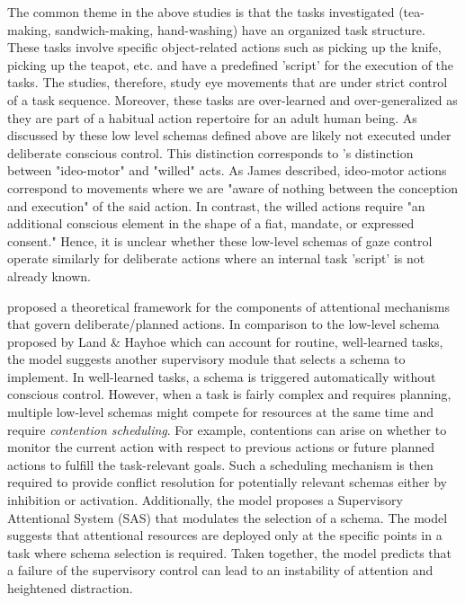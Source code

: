 The common theme in the above studies is that the tasks investigated (tea-making, sandwich-making, hand-washing) have an organized task structure. These tasks involve specific object-related actions such as picking up the knife, picking up the teapot, etc. and have a predefined 'script' for the execution of the tasks. The studies, therefore, study eye movements that are under strict control of a task sequence. Moreover, these tasks are over-learned and over-generalized as they are part of a habitual action repertoire for an adult human being. As discussed by \citet{Land2006-da} these low level schemas defined above are likely not executed under deliberate conscious control. This distinction corresponds to \citet{james2007principles}'s distinction between "ideo-motor" and "willed" acts. As James described, ideo-motor actions correspond to movements where we are "aware of nothing between the conception and execution" of the said action. In contrast, the willed actions require "an additional conscious element in the shape of a fiat, mandate, or expressed consent." Hence, it is unclear whether these low-level schemas of gaze control operate similarly for deliberate actions where an internal task 'script' is not already known.

\citet{Norman1986-qb} proposed a theoretical framework for the components of attentional mechanisms that govern deliberate/planned actions. In comparison to the low-level schema proposed by Land \& Hayhoe which can account for routine, well-learned tasks, the \citet{Norman1986-qb} model suggests another supervisory module that selects a schema to implement. In well-learned tasks, a schema is triggered automatically without conscious control. However, when a task is fairly complex and requires planning, multiple low-level schemas might compete for resources at the same time and require \emph{contention scheduling}. For example, contentions can arise on whether to monitor the current action with respect to previous actions or future planned actions to fulfill the task-relevant goals. Such a scheduling mechanism is then required to provide conflict resolution for potentially relevant schemas either by inhibition or activation. Additionally, the model proposes a Supervisory Attentional System (SAS) that modulates the selection of a schema. The model suggests that attentional resources are deployed only at the specific points in a task where schema selection is required. Taken together, the model predicts that a failure of the supervisory control can lead to an instability of attention and heightened distraction.

